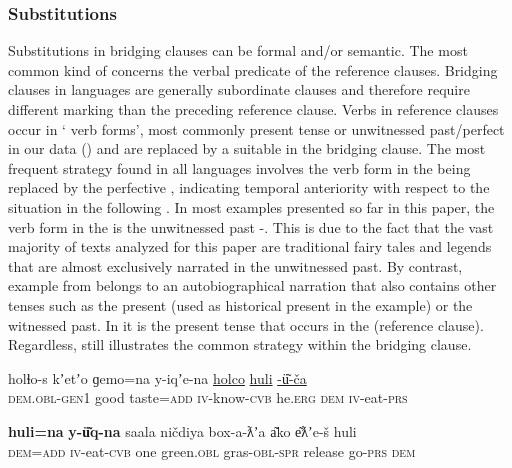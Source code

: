 \documentclass[output=paper]{LSP/langsci}
\begin{document}
\subsubsection{Substitutions}
\label{ssec:Substitutions}
Substitutions in bridging clauses can be formal and/or semantic. The most common kind of  concerns the verbal predicate of the reference clauses. Bridging clauses in  languages are generally subordinate clauses and therefore require different marking than the preceding reference clause. Verbs in reference clauses occur in ` verb forms', most commonly present tense or unwitnessed past/perfect in our data () and are replaced by a suitable  in the bridging clause. The most frequent  strategy found in all  languages involves the verb form in the  being replaced by the perfective , indicating temporal anteriority with respect to the situation in the following . In most examples presented so far in this paper, the verb form in the  is the unwitnessed past -. This is due to the fact that the vast majority of texts analyzed for this paper are traditional fairy tales and legends that are almost exclusively narrated in the unwitnessed past. By contrast, example  from  belongs to an autobiographical narration that also contains other tenses such as the present (used as historical present in the example) or the witnessed past. In  it is the present tense that occurs in the  (reference clause). Regardless,  still illustrates the common  strategy within the bridging clause.  

\clearpage
\begin{exe}
	\ex	\label{ex:13ab} 
	\begin{xlist}
		\ex	\label{ex:13a}
		\gll	holɬo-s     		kʼetʼo 	ɡemo=na   	y-iqʼe-na  			\underline{holco}  	\underline{huli}   \underline{-ü͂-ča}\\
			\textsc{dem.obl-gen1} 	good     taste=\textsc{add}  	\textsc{iv}-know-\textsc{cvb} 	he.\textsc{erg}	\textsc{dem} 	\textsc{iv}-eat-\textsc{prs}\\
		\glt	{}

		\ex	\label{ex:13b}
		\gll			\textbf{huli=na}   	\textbf{y-ü͂q-na}  	saala 	ničdiya 		box-a-ƛʼa 		a͂ko e͂ƛʼe-š 	huli \\
			\textsc{dem=add}  	\textsc{iv}-eat-\textsc{cvb} 	one   	green.\textsc{obl} 	gras-\textsc{obl-spr} 	release go-\textsc{prs} 	\textsc{dem}  \\
		\glt	{}
	\end{xlist}
\end{exe}
\end{document}
